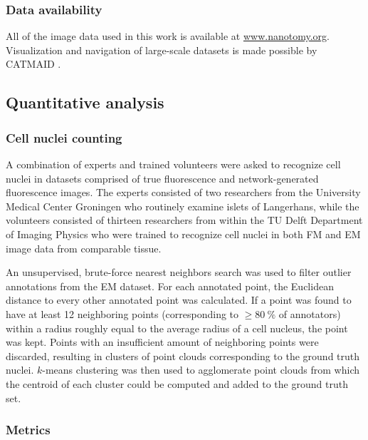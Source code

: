 \subsubsection{Data availability}
All of the image data used in this work is available at \href{http://nanotomy.org/}{www.nanotomy.org}. Visualization and navigation of large-scale datasets is made possible by CATMAID \cite{saalfeld2009catmaid}.



\subsection{Quantitative analysis}
\label{sec:4methods_analysis}

\subsubsection{Cell nuclei counting}
A combination of experts and trained volunteers were asked to recognize cell nuclei in datasets comprised of true fluorescence and network-generated fluorescence images. The experts consisted of two researchers from the University Medical Center Groningen who routinely examine islets of Langerhans, while the volunteers consisted of thirteen researchers from within the TU Delft Department of Imaging Physics who were trained to recognize cell nuclei in both FM and EM image data from comparable tissue.

An unsupervised, brute-force nearest neighbors search was used to filter outlier annotations from the EM dataset. For each annotated point, the Euclidean distance to every other annotated point was calculated. If a point was found to have at least 12 neighboring points (corresponding to $\ge\SI{80}{\percent}$ of annotators) within a radius roughly equal to the average radius of a cell nucleus, the point was kept. Points with an insufficient amount of neighboring points were discarded, resulting in clusters of point clouds corresponding to the ground truth nuclei. $k$-means clustering was then used to agglomerate point clouds from which the centroid of each cluster could be computed and added to the ground truth set.


\subsubsection{Metrics}

